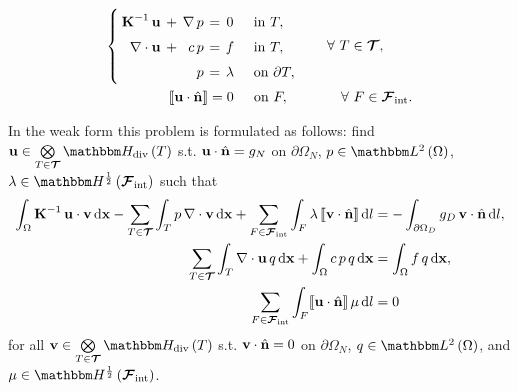 \begin{eqnarray}
	\arraycolsep=2pt\def\arraystretch{1.5}
	\left\{\begin{array}{rcrccl}
	\vect K^{-1}\,\vect u                   & + & \nabla\,p & = & 0       &\quad\text{in } \bcell, \\
	\nabla\cdot\vect u                      & + & c\,p      & = & f       &\quad\text{in } \bcell, \\
											&   & p         & = & \lambda &\quad\text{on } \partial\bcell, %
	\end{array}\right.
	& \qquad \forall~\bcell\in\bmesh, \label{dual_mini} \\
		\llbracket\vect u \cdot \hat{\vect n}\rrbracket = 0\quad\:\:\text{on } F,\:\:\:\:
	& \qquad\quad \forall~F\in\bfaces[int]. \label{flux_cond}
\end{eqnarray}

In the weak form this problem is formulated as follows:
find $\vect u \in \bigotimes\limits_{\bcell\in\bmesh}\HDivSpace[\bcell]$ s.t. $\boldsymbol{\mathbf{u}} \cdot \hat{\boldsymbol{\mathbf{n}}} = g_N$ on $\partial\Omega_N$, $ p\in\LTwoSpace$, $\lambda\in\HHalfSpace[{\bfaces[int]}]$ such that
	\begin{equation}\label{weak_form}
		\begin{split}
			\int_{\Omega} \vect K^{-1}\,\vect u\cdot\vect v \diff \vect x - \sum_{\bcell\in\bmesh}\int_\bcell p\,\nabla\cdot\vect v \diff \vect x + \sum_{\bface\in\bfaces[int]}\int_{\bface} \lambda\,\llbracket\vect v\cdot\hat{\vect n}\rrbracket \diff l &= -\int_{\partial\Omega_D} g_D\,\vect v\cdot\hat{\vect n} \diff l, \\
			\sum_{\bcell\in\bmesh}\int_\bcell \nabla\cdot\vect u\,q \diff \vect x + \int_\Omega c\,p\,q \diff \vect x &= \int_\Omega f\,q \diff \vect x, \\
			\sum_{\bface\in\bfaces[int]}\int_{\bface} \llbracket\vect u\cdot\hat{\vect n}\rrbracket\,\mu \diff l &= 0
		\end{split}
	\end{equation}
	for all $\vect v \in \bigotimes\limits_{\bcell\in\bmesh}\HDivSpace[\bcell]$ s.t. $\boldsymbol{\mathbf{v}} \cdot \hat{\boldsymbol{\mathbf{n}}} = 0$ on $\partial\Omega_N$, $q \in \LTwoSpace[\Omega]$, and $\mu \in \HHalfSpace[{\bfaces[int]}]$.

